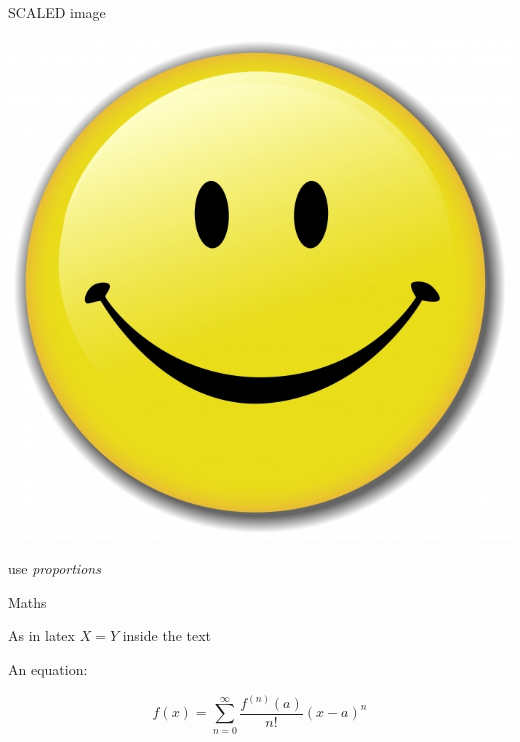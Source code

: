 \begin{frame}{SCALED image}

\centerline{\includegraphics[scale=0.1]{images/smile}}

use \emph{proportions}

\end{frame}

\begin{frame}{Maths}

As in latex $X = Y$ inside the text

An equation:

\[f(x)=\sum_{n=0}^\infty\frac{f^{(n)}(a)}{n!}(x-a)^n\]

\end{frame}


